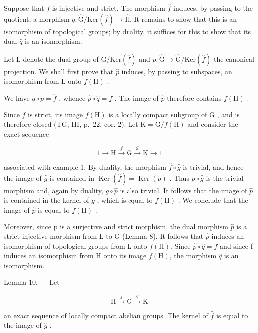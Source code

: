 Suppose that \(f\) is injective and strict. The morphism \(\widehat{f}\) induces, by passing to the quotient, a morphism \(q \colon \widehat{\mathrm{G}} / \mathrm{Ker}(\widehat{f}) \to \widehat{\mathrm{H}}\). It remains to show that this is an isomorphism of topological groups; by duality, it suffices for this to show that its dual \(\widehat{q}\) is an isomorphism.

Let L denote the dual group of \(\widehat{\mathrm{G}}/\mathrm{Ker}(\widehat{f})\) and \(p\colon\widehat{\mathrm{G}}\to\widehat{\mathrm{G}}/\mathrm{Ker}(\widehat{f})\) the canonical projection. We shall first prove that \(\widehat{p}\) induces, by passing to subspaces, an isomorphism from L onto \(f(\mathrm{H})\) .

We have \(q \circ p = \widehat{f}\) , whence \(\widehat{p} \circ \widehat{q} = f\) . The image of \(\widehat{p}\) therefore contains \(f(\mathrm{H})\) .

Since \(f\) is strict, its image \(f(\mathrm{H})\) is a locally compact subgroup of \(\mathrm{G}\) , and is therefore closed (TG, III, p.~22, cor. 2). Let \(\mathrm{K} = \mathrm{G}/f(\mathrm{H})\) and consider the exact sequence

\[
1 \to \mathrm{H} \xrightarrow {f} \mathrm{G} \xrightarrow {g} \mathrm{K} \to 1
\]

associated with example 1. By duality, the morphism \(\widehat{f} \circ \widehat{g}\) is trivial, and hence the image of \(\widehat{g}\) is contained in \(\operatorname{Ker}(\widehat{f}) = \operatorname{Ker}(p)\) . Thus \(p \circ \widehat{g}\) is the trivial morphism and, again by duality, \(g \circ \widehat{p}\) is also trivial. It follows that the image of \(\widehat{p}\) is contained in the kernel of \(g\) , which is equal to \(f(\mathrm{H})\) . We conclude that the image of \(\widehat{p}\) is equal to \(f(\mathrm{H})\) .

Moreover, since p is a surjective and strict morphism, the dual morphism \(\widehat{p}\) is a strict injective morphism from L to G (Lemma 8). It follows that \(\widehat{p}\) induces an isomorphism of topological groups from L onto \(f(\mathrm{H})\). Since \(\widehat{p} \circ \widehat{q} = f\) and since f induces an isomorphism from H onto its image \(f(\mathrm{H})\), the morphism \(\widehat{q}\) is an isomorphism.

Lemma 10. --- Let

\[
\mathrm{H} \xrightarrow {f} \mathrm{G} \xrightarrow {g} \mathrm{K}
\]

an exact sequence of locally compact abelian groups. The kernel of \(\hat{f}\) is equal to the image of \(\hat{g}\) .

